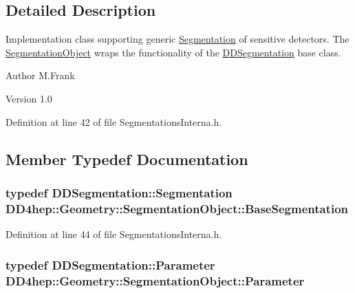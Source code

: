 \subsection{Detailed Description}
Implementation class supporting generic \hyperlink{class_d_d4hep_1_1_geometry_1_1_segmentation}{Segmentation} of sensitive detectors. The \hyperlink{class_d_d4hep_1_1_geometry_1_1_segmentation_object}{SegmentationObject} wraps the functionality of the \hyperlink{namespace_d_d4hep_1_1_d_d_segmentation}{DDSegmentation} base class.

\begin{DoxyAuthor}{Author}
M.Frank 
\end{DoxyAuthor}
\begin{DoxyVersion}{Version}
1.0 
\end{DoxyVersion}


Definition at line 42 of file SegmentationsInterna.h.

\subsection{Member Typedef Documentation}
\hypertarget{class_d_d4hep_1_1_geometry_1_1_segmentation_object_a57ca8eb515f079fdc61916df50468818}{
\subsubsection[{BaseSegmentation}]{\setlength{\rightskip}{0pt plus 5cm}typedef {\bf DDSegmentation::Segmentation} {\bf DD4hep::Geometry::SegmentationObject::BaseSegmentation}}}
\label{class_d_d4hep_1_1_geometry_1_1_segmentation_object_a57ca8eb515f079fdc61916df50468818}


Definition at line 44 of file SegmentationsInterna.h.\hypertarget{class_d_d4hep_1_1_geometry_1_1_segmentation_object_a0d017ffe7385b6fe44bf411386cc672b}{
\subsubsection[{Parameter}]{\setlength{\rightskip}{0pt plus 5cm}typedef {\bf DDSegmentation::Parameter} {\bf DD4hep::Geometry::SegmentationObject::Parameter}}}
\label{class_d_d4hep_1_1_geometry_1_1_segmentation_object_a0d017ffe7385b6fe44bf411386cc672b}


